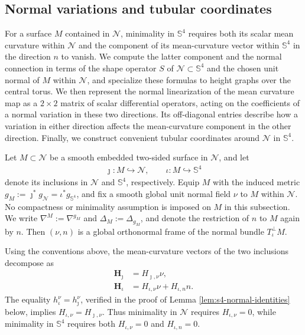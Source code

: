 \documentclass[a4paper,11pt,oneside,reqno]{amsart}
\numberwithin{equation}{section}
\theoremstyle{definition}
\begin{document}
\subsection{Normal variations and tubular coordinates}

For a surface $M$ contained in $\mathcal{N}$, minimality in $\mathbb{S}^4$ requires both its scalar mean curvature within $\mathcal{N}$ and the component of its mean-curvature vector within $\mathbb{S}^4$ in the direction $n$ to vanish. We compute the latter component and the normal connection in terms of the shape operator $S$ of $\mathcal{N}\subset\mathbb{S}^4$ and the chosen unit normal of $M$ within $\mathcal{N}$, and specialize
these formulas to height graphs over the central torus. We then represent the normal linearization of the mean curvature map as a $2\times2$ matrix of scalar differential operators, acting on the coefficients of a normal variation in these two directions. Its off-diagonal entries describe how a variation in either direction affects the mean-curvature component in the other direction. Finally, we construct convenient tubular coordinates around $\mathcal{N}$ in $\mathbb{S}^4$.

Let $M\subset\mathcal{N}$ be a smooth embedded two-sided surface in $\mathcal{N}$, and let
%
\begin{align*}
    \jmath:M\hookrightarrow\mathcal{N},
    \qquad
    \iota:M\hookrightarrow\mathbb{S}^4
\end{align*}
%
denote its inclusions in $\mathcal N$ and $\mathbb S^4$, respectively. Equip $M$ with the induced metric
$g_M:=\jmath^*g_{\mathcal{N}}=\iota^*g_{\mathbb{S}^4}$, and fix a smooth global unit normal field $\nu$ to $M$
within $\mathcal{N}$. No compactness or minimality assumption is imposed on $M$ in this subsection. We write $\nabla^M:=\nabla^{g_M}$ and $\Delta_M:=\Delta_{g_M}$, and denote the restriction of $n$ to $M$ again by $n$. Then $(\nu,n)$ is a global orthonormal frame of the normal bundle $T^\perp_\iota M$.

Using the conventions above, the mean-curvature vectors of the two inclusions decompose as
%
\begin{align*}
    \mathbf{H}_\jmath&=H_{\jmath,\nu}\nu,\\
    \mathbf{H}_\iota&=H_{\iota,\nu}\nu+H_{\iota,n}n.
\end{align*}
%
The equality $h_\iota^\nu=h_\jmath^\nu$, verified in the proof of Lemma \ref{lem:s4-normal-identities} below, implies $H_{\iota,\nu}=H_{\jmath,\nu}$. Thus minimality in $\mathcal{N}$ requires $H_{\iota,\nu}=0$, while minimality in $\mathbb{S}^4$ requires both $H_{\iota,\nu}=0$ and $H_{\iota,n}=0$.
\end{document}
